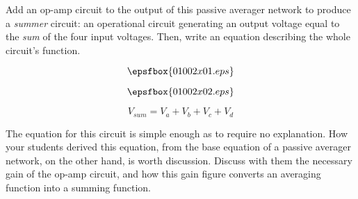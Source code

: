 

Add an op-amp circuit to the output of this passive averager network to produce a {\it summer} circuit: an operational circuit generating an output voltage equal to the {\it sum} of the four input voltages.  Then, write an equation describing the whole circuit's function.

\vskip 30pt

$$\epsfbox{01002x01.eps}$$







$$\epsfbox{01002x02.eps}$$

$$V_{sum} = V_a + V_b + V_c + V_d$$







The equation for this circuit is simple enough as to require no explanation.  How your students derived this equation, from the base equation of a passive averager network, on the other hand, is worth discussion.  Discuss with them the necessary gain of the op-amp circuit, and how this gain figure converts an averaging function into a summing function.




